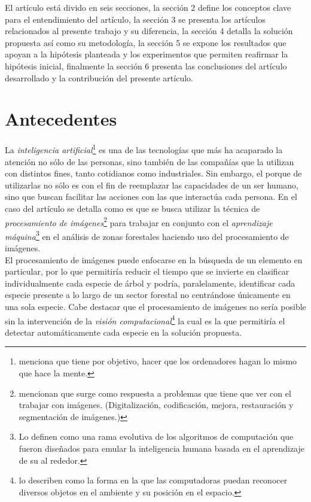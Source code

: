\documentclass[review]{elsarticle}
\begin{document}
El artículo está divido en seis secciones, la sección 2 define los conceptos clave para el entendimiento del artículo, la sección 3 se presenta los artículos relacionados al presente trabajo y su diferencia, la sección 4 detalla la solución propuesta así como su metodología, la sección 5 se expone los resultados que apoyan a la hipótesis planteada  y los experimentos que permiten reafirmar la hipótesis inicial, finalmente la sección 6 presenta las conclusiones del artículo desarrollado y la contribución del presente artículo.

\section{Antecedentes}
La \emph{inteligencia artificial}\footnote{\citet{rf19} menciona que tiene por objetivo, hacer que los ordenadores hagan lo mismo que hace la mente.} es una de las tecnologías que más ha acaparado la atención no sólo de las personas, sino también de las compañías que la utilizan con distintos fines, tanto cotidianos como industriales. Sin embargo, el porque de utilizarlas no sólo es con el fin de reemplazar las capacidades de un ser humano, sino que buscan facilitar las acciones con las que interactúa cada persona. En el caso del artículo se detalla como es que se busca utilizar la técnica de  \emph{procesamiento de imágenes}\footnote{\citet{rf20} mencionan que surge como respuesta a problemas que tiene que ver con el trabajar con imágenes. (Digitalización, codificación, mejora, restauración y segmentación de imágenes.) } para trabajar en conjunto con el \emph{aprendizaje máquina}\footnote{ \citet{rf21} Lo definen como una rama evolutiva de los algoritmos de computación que fueron diseñados para emular la inteligencia humana basada en el aprendizaje de su al rededor.} en el análisis de zonas forestales haciendo uso del procesamiento de imágenes.\\

El procesamiento de imágenes puede enfocarse en la búsqueda de un elemento en particular, por lo que permitiría reducir el tiempo que se invierte en clasificar individualmente cada especie de árbol y podría, paralelamente, identificar cada especie presente  a lo largo de un sector forestal no centrándose únicamente en una sola especie. Cabe destacar que el procesamiento de imágenes no sería posible sin la intervención de la \emph{visión computacional}\footnote{\citet{rf22} lo describen como la forma en la que las computadoras puedan reconocer diversos objetos en el ambiente y su posición en el espacio.} la cual es la que permitiría el detectar automáticamente cada especie en la solución propuesta.\\
\end{document}
